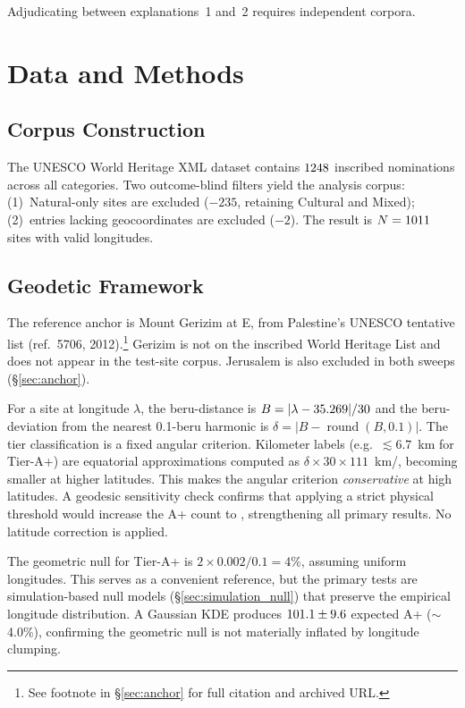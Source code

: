 \documentclass[12pt,a4paper]{article}
\begin{document}
Adjudicating between explanations~1 and~2 requires independent corpora.

\section{Data and Methods}
\label{sec:methods}

\subsection{Corpus Construction}
\label{sec:corpus}

The UNESCO World Heritage XML dataset contains $1248$ inscribed
nominations across all categories. Two outcome-blind filters yield the
analysis corpus: (1)~Natural-only sites are excluded ($-235$, retaining
Cultural and Mixed); (2)~entries lacking geocoordinates are excluded ($-2$).
The result is $N = 1011$ sites with valid longitudes.

\subsection{Geodetic Framework}

The reference anchor is Mount Gerizim at \GerizimLon\textdegree{}E,
from Palestine's UNESCO tentative list (ref.~5706, 2012).\footnote{See
footnote in \S\ref{sec:anchor} for full citation and archived URL.}
Gerizim is not on the inscribed World Heritage List and does not appear
in the test-site corpus. Jerusalem is also excluded in both sweeps (\S\ref{sec:anchor}).

For a site at longitude $\lambda$, the beru-distance is
$B = |\lambda - 35.269| / 30$ and the beru-deviation from the
nearest 0.1-beru harmonic is
$\delta = |B - \operatorname{round}(B, 0.1)|$.
The tier classification is a fixed angular criterion.
Kilometer labels (e.g.\ $\lesssim 6.7$~km for Tier-A+) are equatorial
approximations computed as $\delta \times 30 \times 111$~km/\textdegree{},
becoming smaller at higher latitudes. This makes the angular criterion
\emph{conservative} at high latitudes. A geodesic sensitivity check confirms
that applying a strict physical threshold would increase the A+ count to
\GeodesicApPhysical{}, strengthening all primary results. No latitude
correction is applied.

The geometric null for Tier-A+ is $2 \times 0.002 / 0.1 = 4\%$,
assuming uniform longitudes. This serves as a convenient reference, but
the primary tests are simulation-based null models (\S\ref{sec:simulation_null})
that preserve the empirical longitude distribution. A Gaussian KDE produces
$101.1 \pm 9.6$ expected A+ ($\sim$4.0\%), confirming the
geometric null is not materially inflated by longitude clumping.
\end{document}
